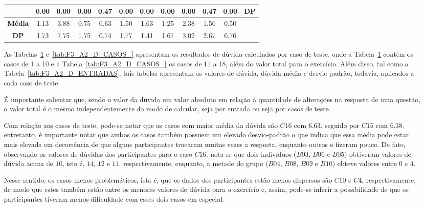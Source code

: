 \begin{table}[htbp]
\begin{tabular}{|c|c|c|c|c|c|c|c|c|c|c|c}
		\rowcolor[HTML]{D9D9D9} 
		\multirow{-3}{*}{\cellcolor[HTML]{F2F2F2}\textbf{B10}} & 0.00 & 0.00 & 0.00 & 0.47 & 0.00 & 0.00 & 0.00 & 0.00 & 0.47 & 0.00 & \multicolumn{1}{c|}{\cellcolor[HTML]{D9D9D9}DP} \\ \hline
		\textbf{Média} & 1.13 & 3.88 & 0.75 & 0.63 & 1.50 & 1.63 & 1.25 & 2.38 & 1.50 & 0.50 & \multicolumn{1}{l}{} \\ \cline{1-11}
		\cellcolor[HTML]{D9D9D9}\textbf{DP} & \cellcolor[HTML]{D9D9D9}1.73 & \cellcolor[HTML]{D9D9D9}7.75 & \cellcolor[HTML]{D9D9D9}1.75 & \cellcolor[HTML]{D9D9D9}0.74 & \cellcolor[HTML]{D9D9D9}1.77 & \cellcolor[HTML]{D9D9D9}1.41 & \cellcolor[HTML]{D9D9D9}1.67 & \cellcolor[HTML]{D9D9D9}3.02 & \cellcolor[HTML]{D9D9D9}2.67 & \cellcolor[HTML]{D9D9D9}0.76 & \multicolumn{1}{l}{} \\ \cline{1-11}
	\end{tabular}
	\label{tab:F3_A2_D_CASOS}
\end{table}

As Tabelas~\ref{tab:F3_A2_D_CASOS} e~\ref{tab:F3_A2_D_CASOS_} apresentam os resultados de dúvida calculados por caso de teste, onde a Tabela~\ref{tab:F3_A2_D_CASOS} contém os casos de 1 a 10 e a Tabela~\ref{tab:F3_A2_D_CASOS_} os casos de 11 a 18, além do valor total para o exercício. Além disso, tal como a Tabela~\ref{tab:F3_A2_D_ENTRADAS}, tais tabelas apresentam os valores de dúvida, dúvida média e desvio-padrão, todavia, aplicados a cada caso de teste.

É importante salientar que, sendo o valor da dúvida um valor absoluto em relação à quantidade de alterações na resposta de uma questão, o valor total é o mesmo independentemente do modo de calcular, seja por entrada ou seja por casos de teste.

Com relação aos casos de teste, pode-se notar que os casos com maior média da dúvida são $C16$ com $6.63$, seguido por $C15$ com $6.38$, entretanto, é importante notar que ambos os casos também possuem um elevado desvio-padrão o que indica que essa média pode estar mais elevada em decorrência de que alguns participantes trocaram muitas vezes a resposta, enquanto outros o fizeram pouco. De fato, observando os valores de dúvidas dos participantes para o caso $C16$, nota-se que dois indivíduos ($B03$, $B06$ e $B05$) obtiveram valores de dúvida acima de $10$, isto é, $14$, $12$ e $11$, respectivamente, enquanto, a metade do grupo ($B04$, $B08$, $B09$ e $B10$) obteve valores entre $0$ e $4$.

Nesse sentido, os casos menos problemáticos, isto é, que os dados dos participantes estão menos dispersos são $C10$ e $C4$, respectivamente, de modo que estes também estão entre os menores valores de dúvida para o exercício e, assim, pode-se inferir a possibilidade de que os participantes tiveram menos dificuldade com esses dois casos em especial.

